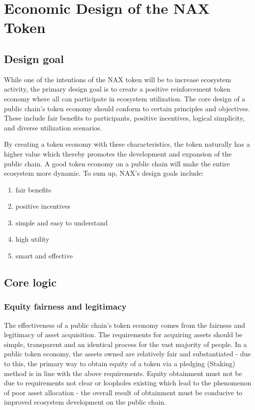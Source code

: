 \section{Economic Design of the NAX Token}
\subsection{Design goal}
While one of the intentions of the NAX token will be to increase ecosystem activity, the primary design goal is to create a positive reinforcement token economy where all can participate in ecosystem utilization. The core design of a public chain's token economy should conform to certain principles and objectives. These include fair benefits to participants, positive incentives, logical simplicity, and diverse utilization scenarios. 

By creating a token economy with these characteristics, the token naturally has a higher value which thereby promotes the development and expansion of the public chain. A good token economy on a public chain will make the entire ecosystem more dynamic. To sum up, NAX's design goals include:

\begin{enumerate}[\hspace{2cm}(a)]
    \item fair benefits
    \item positive incentives
    \item simple and easy to understand
    \item high utility
    \item smart and effective
\end{enumerate}

\subsection{Core logic}

\subsubsection{Equity fairness and legitimacy}
The effectiveness of a public chain's token economy comes from the fairness and legitimacy of asset acquisition. The requirements for acquiring assets should be simple, transparent and an identical process for the vast majority of people. In a public token economy, the assets owned are relatively fair and substantiated - due to this, the primary way to obtain equity of a token via a pledging (Staking) method is in line with the above requirements. Equity obtainment must not be due to requirements not clear or loopholes existing which lead to the phenomenon of poor asset allocation - the overall result of obtainment must be conducive to improved ecosystem development on the public chain.

